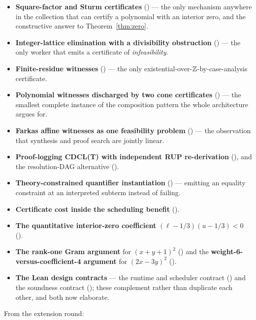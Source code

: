 \begin{itemize}[leftmargin=1.4em]
\item \textbf{Square-factor and Sturm certificates} () --- the only
  mechanism anywhere in the collection that can certify a polynomial with an
  interior zero, and the constructive answer to Theorem~\ref{thm:zero}.
\item \textbf{Integer-lattice elimination with a divisibility obstruction}
  () --- the only worker that emits a certificate of \emph{infeasibility}.
\item \textbf{Finite-residue witnesses} () --- the only
  existential-over-$\mathbb{Z}$-by-case-analysis certificate.
\item \textbf{Polynomial witnesses discharged by two cone certificates}
  () --- the smallest complete instance of the composition pattern the
  whole architecture argues for.
\item \textbf{Farkas affine witnesses as one feasibility problem} () ---
  the observation that synthesis and proof search are jointly linear.
\item \textbf{Proof-logging CDCL(T) with independent RUP re-derivation}
  (), and the resolution-DAG alternative ().
\item \textbf{Theory-constrained quantifier instantiation} () ---
  emitting an equality constraint at an interpreted subterm instead of failing.
\item \textbf{Certificate cost inside the scheduling benefit} ().
\item \textbf{The quantitative interior-zero coefficient}
  $(\ell-1/3)(u-1/3)<0$ ().
\item \textbf{The rank-one Gram argument} for $(x+y+1)^2$ () and the
  \textbf{weight-6-versus-coefficient-4 argument} for $(2x-3y)^2$ ().
\item \textbf{The Lean design contracts} --- the runtime and scheduler contract
  () and the  soundness contract (); these
  complement rather than duplicate each other, and both now elaborate.
\end{itemize}

From the extension round:

